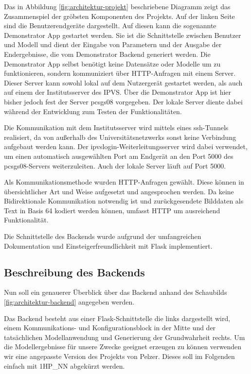 \documentclass[a4paper]{extarticle}
\begin{document}
    Das in Abbildung \ref{fig:architektur-projekt} beschriebene Diagramm zeigt das Zusammenspiel der gröbsten Komponenten des Projekts.
    Auf der linken Seite sind die Benutzerendgeräte dargestellt. 
    Auf diesen kann die sogenannte Demonstrator App gestartet werden.
    Sie ist die Schnittstelle zwischen Benutzer und Modell und dient der Eingabe von Parametern und der Ausgabe der Endergebnisse, 
    die vom Demonstrator Backend generiert werden. 
    Die Demonstrator App selbst benötigt keine Datensätze oder Modelle um zu funktionieren, sondern kommuniziert über HTTP-Anfragen mit einem Server.
    Dieser Server kann sowohl lokal auf dem Nutzergerät gestartet werden, als auch auf einem der Institutsserver des IPVS.
    Über die Demonstrator App ist hier bisher jedoch fest der Server \glqq{}pcsgs08\grqq{} vorgegeben.
    Der lokale Server diente dabei während der Entwicklung zum Testen der Funktionalitäten. 

    Die Kommunikation mit dem Institutsserver wird mittels eines ssh-Tunnels realisiert, 
    da von außerhalb des Universitätsnetzwerks sonst keine Verbindung aufgebaut werden kann.
    Der ipvslogin-Weiterleitungsserver wird dabei verwendet, 
    um einen automatisch ausgewählten Port am Endgerät an den Port 5000 des pcsgs08-Servers weiterzuleiten.
    Auch der lokale Server läuft auf Port 5000.

    Als Kommunikationsmethode wurden HTTP-Anfragen gewählt. 
    Diese können in übersichtlicher Art und Weise aufgesetzt und angesprochen werden.
    Da keine Bidirektionale Kommunikation notwendig ist und zurückgesendete Bilddaten als Text in Basis 64 kodiert werden können,
    umfasst HTTP um ausreichend Funktionalität.

    Die Schnittstelle des Backends wurde aufgrund der umfangreichen Dokumentation und Einsteigerfreundlichkeit mit Flask implementiert.
    
    \subsection{Beschreibung des Backends}

    Nun soll ein genauerer Überblick über das Backend anhand des Schaubilds \ref{fig:architektur-backend} angegeben werden.
  
    Das Backend besteht aus einer Flask-Schnittstelle die links dargestellt wird, einem Kommunikations- und Konfigurationsblock in der Mitte
    und der tatsächlichen Modellanwendung und Generierung der Grundwahrheit rechts.
    Um die Modellergebnisse für unsere Zwecke geeignet erzeugen zu können verwenden wir eine angepasste Version des Projekts von Pelzer.
    Dieses soll im Folgenden einfach mit 1HP\_NN abgekürzt werden.
\end{document}
